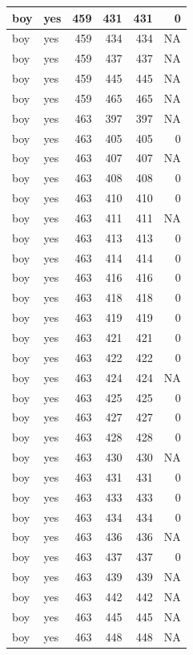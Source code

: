 \documentclass[man]{apa6}
\begin{document}
\begin{tabular}{l|l|r|r|r|r}
\hline
boy & yes & 459 & 431 & 431 & 0\\
\hline
boy & yes & 459 & 434 & 434 & NA\\
\hline
boy & yes & 459 & 437 & 437 & NA\\
\hline
boy & yes & 459 & 445 & 445 & NA\\
\hline
boy & yes & 459 & 465 & 465 & NA\\
\hline
boy & yes & 463 & 397 & 397 & NA\\
\hline
boy & yes & 463 & 405 & 405 & 0\\
\hline
boy & yes & 463 & 407 & 407 & NA\\
\hline
boy & yes & 463 & 408 & 408 & 0\\
\hline
boy & yes & 463 & 410 & 410 & 0\\
\hline
boy & yes & 463 & 411 & 411 & NA\\
\hline
boy & yes & 463 & 413 & 413 & 0\\
\hline
boy & yes & 463 & 414 & 414 & 0\\
\hline
boy & yes & 463 & 416 & 416 & 0\\
\hline
boy & yes & 463 & 418 & 418 & 0\\
\hline
boy & yes & 463 & 419 & 419 & 0\\
\hline
boy & yes & 463 & 421 & 421 & 0\\
\hline
boy & yes & 463 & 422 & 422 & 0\\
\hline
boy & yes & 463 & 424 & 424 & NA\\
\hline
boy & yes & 463 & 425 & 425 & 0\\
\hline
boy & yes & 463 & 427 & 427 & 0\\
\hline
boy & yes & 463 & 428 & 428 & 0\\
\hline
boy & yes & 463 & 430 & 430 & NA\\
\hline
boy & yes & 463 & 431 & 431 & 0\\
\hline
boy & yes & 463 & 433 & 433 & 0\\
\hline
boy & yes & 463 & 434 & 434 & 0\\
\hline
boy & yes & 463 & 436 & 436 & NA\\
\hline
boy & yes & 463 & 437 & 437 & 0\\
\hline
boy & yes & 463 & 439 & 439 & NA\\
\hline
boy & yes & 463 & 442 & 442 & NA\\
\hline
boy & yes & 463 & 445 & 445 & NA\\
\hline
boy & yes & 463 & 448 & 448 & NA\\

\end{tabular}
\end{document}
